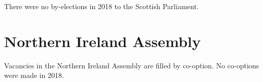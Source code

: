 \documentclass[a4paper,openany]{book}
\begin{document}
There were no by-elections in 2018 to the Scottish Parliament.
%
%
%
%
%
%
%

\section{Northern Ireland Assembly}

Vacancies in the Northern Ireland Assembly are filled by co-option.
No co-options were made in 2018.
%
\end{document}
